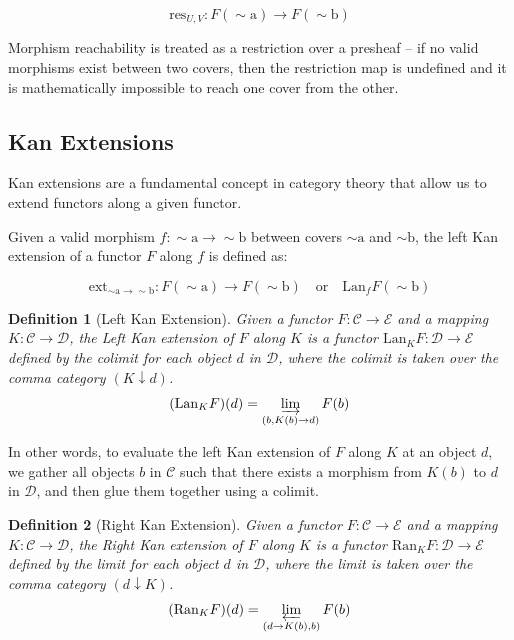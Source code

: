 \documentclass[11pt]{article}
\newtheorem{definition}{Definition}[section]
\begin{document}
\[
    \text{res}_{U, V} : F(\sim\!\text{a}) \longrightarrow F(\sim\!\text{b})
\]

Morphism reachability is treated as a restriction over a presheaf -- if no valid morphisms exist between two covers, then the restriction map is undefined and it is mathematically impossible to reach one cover from the other.

\subsection{Kan Extensions}
Kan extensions are a fundamental concept in category theory that allow us to extend functors along a given functor.

Given a valid morphism $f : \sim\!\text{a} \to \sim\!\textrm{b}$ between covers $\sim\!\text{a}$ and $\sim\!\text{b}$, the left Kan extension of a functor $F$ along $f$ is defined as:

\[
    \text{ext}_{\sim\!\text{a} \to \sim\!\text{b}} : F(\sim\!\text{a}) \longrightarrow F(\sim\!\text{b}) \quad \text{or} \quad \text{Lan}_f F(\sim\!\text{b})
\]

\begin{definition}[Left Kan Extension]
    Given a functor $F: \mathcal{C} \to \mathcal{E}$ and a mapping $K: \mathcal{C} \to \mathcal{D}$, the Left Kan extension of $F$ along $K$ is a functor $\text{Lan}_K F: \mathcal{D} \to \mathcal{E}$ defined by the colimit for each object $d$ in $\mathcal{D}$, where the colimit is taken over the comma category $(K \downarrow d)$.
    \[
        (\text{Lan}_K F)(d) = \varinjlim_{(b, K(b) \to d)} F(b)
    \]
\end{definition}

In other words, to evaluate the left Kan extension of $F$ along $K$ at an object $d$, we gather all objects $b$ in $\mathcal{C}$ such that there exists
a morphism from $K(b)$ to $d$ in $\mathcal{D}$, and then glue them together using a colimit.

\begin{definition}[Right Kan Extension]
    Given a functor $F: \mathcal{C} \to \mathcal{E}$ and a mapping $K: \mathcal{C} \to \mathcal{D}$, the Right Kan extension of $F$ along $K$ is a functor $\text{Ran}_K F: \mathcal{D} \to \mathcal{E}$ defined by the limit for each object $d$ in $\mathcal{D}$, where the limit is taken over the comma category $(d \downarrow K)$.
    \[
        (\text{Ran}_K F)(d) = \varprojlim_{(d \to K(b), b)} F(b)
    \]
\end{definition}
\end{document}
